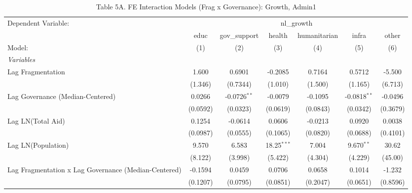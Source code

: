 \begin{table}[H]
   \caption{Table 5A. FE Interaction Models (Frag x Governance): Growth, Admin1}
   \centering
   \begin{tabular}{lcccccc}
      \tabularnewline \midrule \midrule
      Dependent Variable: & \multicolumn{6}{c}{nl\_growth}\\
                                                           & educ     & gov\_support   & health        & humanitarian & infra          & other \\   
      Model:                                               & (1)      & (2)            & (3)           & (4)          & (5)            & (6)\\  
      \midrule
      \emph{Variables}\\
      Lag Fragmentation                                    & 1.600    & 0.6901         & -0.2085       & 0.7164       & 0.5712         & -5.500\\   
                                                           & (1.346)  & (0.7344)       & (1.010)       & (1.500)      & (1.165)        & (6.713)\\   
      Lag Governance (Median-Centered)                     & 0.0266   & -0.0726$^{**}$ & -0.0079       & -0.1095      & -0.0818$^{**}$ & -0.0496\\   
                                                           & (0.0592) & (0.0323)       & (0.0619)      & (0.0843)     & (0.0342)       & (0.3679)\\   
      Lag LN(Total Aid)                                    & 0.1254   & -0.0614        & 0.0606        & -0.0213      & 0.0920         & 0.0038\\   
                                                           & (0.0987) & (0.0555)       & (0.1065)      & (0.0820)     & (0.0688)       & (0.4101)\\   
      Lag LN(Population)                                   & 9.570    & 6.583          & 18.25$^{***}$ & 7.004        & 9.670$^{**}$   & 30.62\\   
                                                           & (8.122)  & (3.998)        & (5.422)       & (4.304)      & (4.229)        & (45.00)\\   
      Lag Fragmentation x Lag Governance (Median-Centered) & -0.1594  & 0.0459         & 0.0706        & 0.0658       & 0.1014         & -1.232\\   
                                                           & (0.1207) & (0.0795)       & (0.0851)      & (0.2047)     & (0.0651)       & (0.8596)\\   

\end{tabular}
\end{table}

